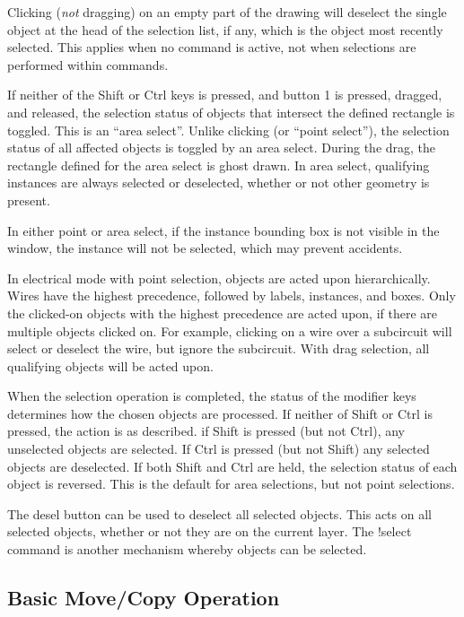 Clicking ({\it not} dragging) on an empty part of the drawing will
deselect the single object at the head of the selection list, if any,
which is the object most recently selected.  This applies when no
command is active, not when selections are performed within commands.

If neither of the {\kb Shift} or {\kb Ctrl} keys is pressed, and
button 1 is pressed, dragged, and released, the selection status of
objects that intersect the defined rectangle is toggled.  This is an
``area select''.  Unlike clicking (or ``point select''), the selection
status of all affected objects is toggled by an area select.  During
the drag, the rectangle defined for the area select is ghost drawn. 
In area select, qualifying instances are always selected or
deselected, whether or not other geometry is present.

In either point or area select, if the instance bounding box is not
visible in the window, the instance will not be selected, which may
prevent accidents.

In electrical mode with point selection, objects are acted upon
hierarchically.  Wires have the highest precedence, followed by
labels, instances, and boxes.  Only the clicked-on objects with the
highest precedence are acted upon, if there are multiple objects
clicked on.  For example, clicking on a wire over a subcircuit will
select or deselect the wire, but ignore the subcircuit.  With drag
selection, all qualifying objects will be acted upon.

When the selection operation is completed, the status of the modifier
keys determines how the chosen objects are processed.  If neither of
{\kb Shift} or {\kb Ctrl} is pressed, the action is as described.  if
{\kb Shift} is pressed (but not {\kb Ctrl}), any unselected objects
are selected.  If {\kb Ctrl} is pressed (but not {\kb Shift}) any
selected objects are deselected.  If both {\kb Shift} and {\kb Ctrl}
are held, the selection status of each object is reversed.  This is
the default for area selections, but not point selections.

The {\cb desel} button can be used to deselect all selected objects. 
This acts on all selected objects, whether or not they are on the
current layer.  The {\cb !select} command is another mechanism whereby
objects can be selected.

\subsection{Basic Move/Copy Operation}

